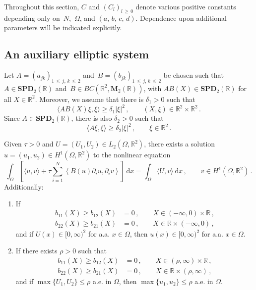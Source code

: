\documentclass[AHL,Unicode,longabstracts,published]{cedram}
\newcommand{\bbR}{\mathbb{R}}
\newcommand{\rmd}{\mathrm{d}}
\newcommand{\bfM}{\mathbf{M}}
\newcommand{\bSPD}{\mathbf{SPD}}
\newcommand*{\romanenumi}{\renewcommand*{\theenumi}{\roman{enumi}}}
\begin{document}
Throughout this section, $C$ and $(C_l)_{l\,\ge\,0}$ denote various positive constants depending only on~$N$,~$\Omega$, and $(a,\, b,\, c,\, d)$. Dependence upon additional parameters will be indicated explicitly.



\subsection{An auxiliary elliptic system}\label{sec2.1}



Let $A=(a_{jk})_{1\,\le\,j,\,k\,\le\,2}$ and~$B=(b_{jk})_{1\,\le\,j,\,k\,\le\,2}$ be chosen such that~${A\in \bSPD_2(\bbR)}$ and~${B\in BC(\bbR^2,\bfM_2(\bbR))}$, with $AB(X)\in \bSPD_2(\bbR)$ for all $X\in \bbR^2$. Moreover, we assume that there is $\delta_1>0$ such that
\begin{equation}\label{ap1}
\langle AB(X)\xi,\xi \rangle \ge \delta_1 |\xi|^2\,, \qquad (X,\xi)\in \bbR^2\times\bbR^2\,. 
\end{equation}
Since $A\in \bSPD_2(\bbR)$, there is also $\delta_2>0$ such that
\begin{equation}\label{ap2}
\langle A\xi,\xi \rangle \ge\delta_2 |\xi|^2\,, \qquad \xi\in\bbR^2\,. 
\end{equation}


\begin{lemm}\label{lem.ap1}
Given $\tau>0$ and $U=(U_1,U_2)\in L_2(\Omega,\bbR^2)$, there exists a solution~$u=(u_1,u_2)\in H^1(\Omega,\bbR^2)$ to the nonlinear equation
\begin{equation}\label{ap3}
\int_\Omega \left[\langle u, v \rangle + \tau \sum_{i=1}^N\left\langle B(u) \partial_i u, \partial_i v \right\rangle \right]\ \rmd x = \int_\Omega \langle U, v \rangle\ \rmd x\,, \qquad v\in H^1\left(\Omega,\bbR^2\right)\,. 
\end{equation}
Additionally:
\begin{enumerate}\romanenumi
\item\label{lemm2.2.i} If
\begin{equation}\label{ap10}
\begin{split}
b_{11}(X) \geq b_{12}(X) & = 0\,, \qquad X\in (-\infty,0)\times \bbR\,, \\
b_{22}(X) \geq b_{21}(X) & = 0\,, \qquad X\in \bbR\times (-\infty,0)\,,
\end{split} 
\end{equation}
and if $U(x)\in [0,\infty)^2$ for a.a. $x\in\Omega$, then $u(x)\in [0,\infty)^2$ for a.a. $x\in\Omega$.
\item\label{lemm2.2.ii} If there exists $\rho>0$ such that
\begin{equation}\label{ap10'}
\begin{split}
b_{11}(X) \geq b_{12}(X) & = 0\,, \qquad X\in (\rho,\infty)\times \bbR\,, \\
b_{22}(X) \geq b_{21}(X) & = 0\,, \qquad X\in \bbR\times (\rho,\infty)\,,
\end{split} 
\end{equation}
and if $\max\{U_1, U_2\} \leq \rho$ a.e. in $\Omega$, then $\max\{u_1, u_2\}\leq \rho$ a.e. in $\Omega$.
\end{enumerate}
\end{lemm}
\end{document}

